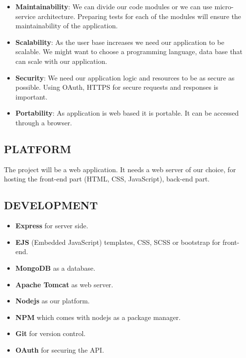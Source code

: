 \documentclass[a4paper, 10pt, conference]{ieeeconf}
\begin{document}
\begin{itemize}
    \item \textbf{Maintainability}: We can divide our code modules or we can use micro-service architecture. Preparing tests for each of the modules will ensure the maintainability of the application.
    \item \textbf{Scalability}: As the user base increases we need our application to be scalable. We might want to choose a programming language, data base that can scale with our application.
    \item \textbf{Security}: We need our application logic and resources to be as secure as possible. Using OAuth, HTTPS for secure requests and responses is important.
    \item \textbf{Portability}: As application is web based it is portable. It can be accessed through a browser.
\end{itemize}

\subsection{PLATFORM}
The project will be a web application. It needs a web server of our choice, for hosting the front-end part (HTML, CSS, JavaScript), back-end part.

\subsection{DEVELOPMENT}

\begin{itemize}

	\item \textbf{Express} for server side.
	\item \textbf{EJS} (Embedded JavaScript) templates, CSS, SCSS or bootstrap for front-end.
	\item \textbf{MongoDB} as a database.
	\item \textbf{Apache Tomcat} as web server.
	\item \textbf{Nodejs} as our platform.
	\item \textbf{NPM} which comes with nodejs as a package manager.
	\item \textbf{Git} for version control.
	\item \textbf{OAuth} for securing the API.

\end{itemize}
\end{document}
